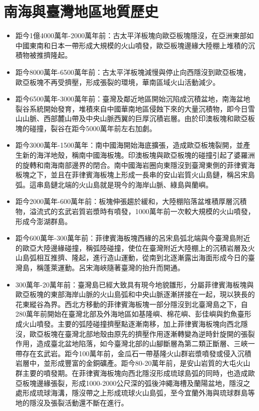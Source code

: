 \documentclass[a4paper,12pt]{report}
\begin{document}
\section{南海與臺灣地區地質歷史}
\bctf{}\efct
\begin{itemize}
\item 距今1億4000萬年-2000萬年前：古太平洋板塊向歐亞板塊隱沒，在亞洲東部如中國東南和日本一帶形成大規模的火山噴發，歐亞板塊邊緣大陸棚上堆積的沉積物被推擠隆起。
\item 距今8000萬年-6500萬年前：古太平洋板塊減慢與停止向西隱沒到歐亞板塊，歐亞板塊不再受擠壓，形成張裂的環境，華南區域火山活動減少。
\item 距今6500萬年-3000萬年前：臺灣及鄰近地區開始沉陷成沉積盆地，南海盆地裂谷系統開始發育，堆積來自中國華南地區侵蝕下來的大量沉積物，即今日雪山山脈、西部麓山帶及中央山脈西翼的巨厚沉積岩層。由於印澳板塊和歐亞板塊的碰撞，裂谷在距今5000萬年前左右加劇。
\item 距今3000萬年-1500萬年：南中國海開始海底擴張，造成歐亞板塊裂開，並產生新的海洋地殼，稱南中國海板塊。印澳板塊與歐亞板塊的碰撞引起了婆羅洲的旋轉和南海南部邊界的閉合。南中國海岩圈向東隱沒到臺灣東側的菲律賓海板塊之下，並且在菲律賓海板塊上形成一長串的安山岩質火山島鏈，稱呂宋島弧。這串島鏈北端的火山島就是現今的海岸山脈、綠島與蘭嶼。
\item 距今2000萬年-600萬年前：板塊伸張趨於緩和，大陸棚陷落盆堆積厚層沉積物，溢流式的玄武岩質岩漿時有噴發，1000萬年前一次較大規模的火山噴發，形成今澎湖群島。
\item 距今600萬年-300萬年前：菲律賓海板塊西緣的呂宋島弧北端與今臺灣島附近的歐亞大陸邊緣碰撞，稱弧陸碰撞，使位在臺灣附近大陸棚上的沉積岩層及火山島弧相互推擠、隆起，進行造山運動，從南到北逐漸露出海面形成今日的臺灣島，稱蓬萊運動。呂宋海峽隨著臺灣的抬升而開通。
\item 300萬年-20萬年前：臺灣島已經大致具有現今地貌雛形，分屬菲律賓海板塊與歐亞板塊的東部海岸山脈的火山島弧和中央山脈逐漸拼接在一起，現以狹長的花東縱谷為界。西北方移動的菲律賓海板塊一部分隱沒到北臺灣島之下，自280萬年前開始在臺灣北部及外海地區如基隆嶼、棉花嶼、彭佳嶼與釣魚臺形成火山噴發。主要的弧陸碰撞擠壓點逐漸南移，加上菲律賓海板塊向西北隱沒，歐亞板塊在臺灣北部地殼由原先的擠壓作用逐漸轉變為逆時針旋開的張裂作用，造成臺北盆地陷落，如今臺灣北部的山腳斷層為第二類正斷層、三峽一帶存在玄武岩。距今100萬年前，金瓜石一帶基隆火山群岩漿噴發或侵入沉積岩層中，並形成豐富的金銅礦產。距今80-20萬年前，是安山岩質的大屯火山群主要的噴發期。在菲律賓海板塊向西北隱沒形成琉球島弧的同時，也造成歐亞板塊邊緣張裂，形成1000-2000公尺深的弧後沖繩海槽及蘭陽盆地，隱沒之處形成琉球海溝，隱沒帶之上形成琉球火山島弧，至今宜蘭外海與琉球群島等地的隱沒及張裂活動還不斷在進行。

\end{itemize}
\end{document}
